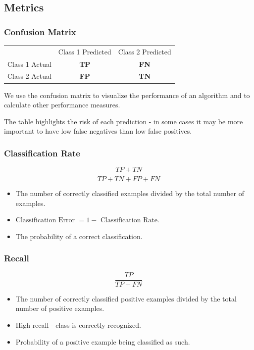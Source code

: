 \documentclass[11pt]{article}
\begin{document}
\subsection{Metrics}
\subsubsection{Confusion Matrix}
\begin{center}
  \begin{tabular}{c c c}
    & Class 1 Predicted & Class 2 Predicted \\
    Class 1 Actual & \textbf{TP} & \textbf{FN} \\
    Class 2 Actual & \textbf{FP} & \textbf{TN}
  \end{tabular}
\end{center}
We use the confusion matrix to visualize the performance of an algorithm and to calculate other performance measures.

The table highlights the risk of each prediction - in some cases it may be more important to have low false negatives than low false positives.

\subsubsection{Classification Rate}
\[
  \frac{TP + TN}{TP + TN + FP + FN}
\]
\begin{itemize}
  \item The number of correctly classified examples divided by the total number of examples.
  \item $\text{Classification Error } = 1 - \text{ Classification Rate}$.
  \item The probability of a correct classification.
\end{itemize}

\subsubsection{Recall}
\[
  \frac{TP}{TP + FN}
\]
\begin{itemize}
  \item The number of correctly classified positive examples divided by the total number of positive examples.
  \item High recall - class is correctly recognized.
  \item Probability of a positive example being classified as such.
\end{itemize}
\end{document}
